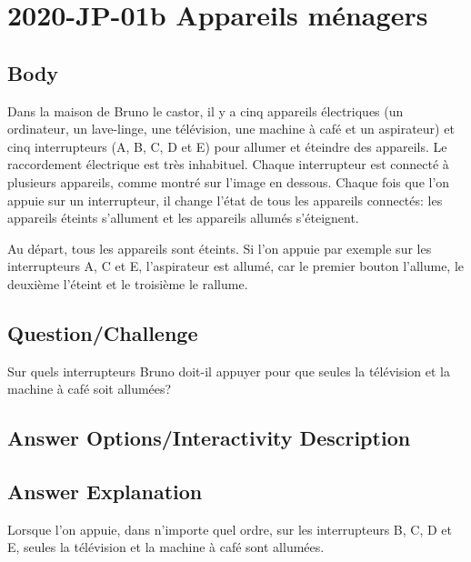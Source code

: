 \documentclass[a4paper,11pt]{report}
\newcommand{\taskGraphicsFolder}{..}
\begin{document}
\section*{\centering{} 2020-JP-01b Appareils ménagers}


\subsection*{Body}

Dans la maison de Bruno le castor, il y a cinq appareils électriques (un ordinateur, un lave-linge, une télévision, une machine à café et un aspirateur) et cinq interrupteurs (A, B, C, D et E) pour allumer et éteindre des appareils. Le raccordement électrique est très inhabituel. Chaque interrupteur est connecté à plusieurs appareils, comme montré sur l’image en dessous. Chaque fois que l’on appuie sur un interrupteur, il change l’état de tous les appareils connectés: les appareils éteints s’allument et les appareils allumés s’éteignent.

Au départ, tous les appareils sont éteints. Si l’on appuie par exemple sur les interrupteurs A, C et E, l’aspirateur est allumé, car le premier bouton l’allume, le deuxième l’éteint et le troisième le rallume.

{\em

\subsection*{Question/Challenge}

Sur quels interrupteurs Bruno doit-il appuyer pour que seules la télévision et la machine à café soit allumées?

{\centering%
\par}

}\begingroup
\renewcommand{\arraystretch}{1.5}
\subsection*{Answer Options/Interactivity Description}



\endgroup

\subsection*{Answer Explanation}

Lorsque l’on appuie, dans n’importe quel ordre, sur les interrupteurs B, C, D et E, seules la télévision et la machine à café sont allumées.
\end{document}
